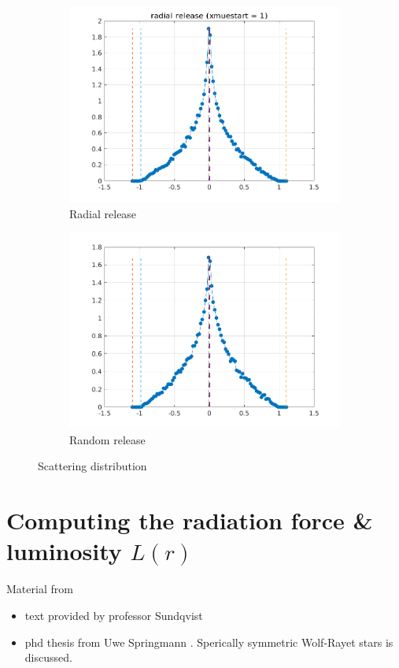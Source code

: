 \documentclass[../main/main.tex]{subfiles}
\begin{document}
\begin{figure}[!htbp]
\centering
\begin{subfigure}{.5\textwidth}
\includegraphics[width=1\textwidth]{../../two_resonance_lines/figures/scattering_distribution_radial_release.png}
\caption{Radial release}
\end{subfigure}%
\begin{subfigure}{.5\textwidth}
\includegraphics[width=1\textwidth]{../../two_resonance_lines/figures/scattering_distribution_random_release.png}
\caption{Random release}
\end{subfigure}
\caption{Scattering distribution}
\label{PCyg_mu_eq_1}
\end{figure}

\newpage
\section{Computing the radiation force \& luminosity $L(r)$}
\label{computing_radiation_force}
Material from 
\begin{itemize}
\item text provided by professor Sundqvist
\item phd thesis from Uwe Springmann \cite{UweSpringmannPHD}. Sperically symmetric Wolf-Rayet stars is discussed.
\end{itemize}
\end{document}
